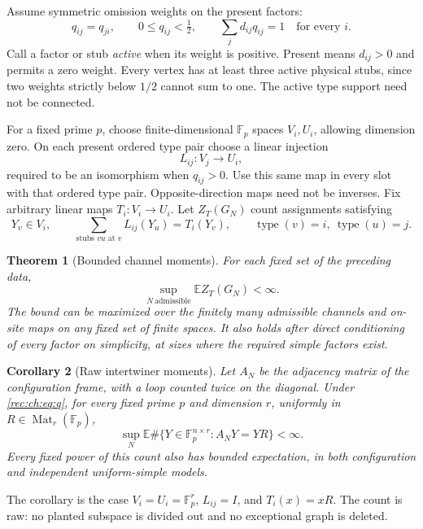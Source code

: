 \documentclass[11pt]{article}
\newtheorem{theorem}{Theorem}[section]
\newtheorem{corollary}[theorem]{Corollary}
\theoremstyle{definition}
\theoremstyle{remark}
\newcommand{\E}{\mathbb E}
\newcommand{\1}{\mathbf 1}
\providecommand{\Fp}{\mathbb F_p}
\begin{document}
Assume symmetric omission weights on the present factors:
\begin{equation}\label{rec:ch:eq:q}
 q_{ij}=q_{ji},\qquad 0\le q_{ij}<\tfrac12,\qquad
 \sum_j d_{ij}q_{ij}=1\quad\text{for every }i.
\end{equation}
Call a factor or stub \emph{active} when its weight is positive. Present means $d_{ij}>0$ and permits a zero weight. Every vertex has at least three active physical stubs, since two weights strictly below $1/2$ cannot sum to one. The active type support need not be connected.

For a fixed prime $p$, choose finite-dimensional $\Fp$ spaces $V_i,U_i$, allowing dimension zero. On each present ordered type pair choose a linear injection
\[
 L_{ij}:V_j\longrightarrow U_i,
\]
required to be an isomorphism when $q_{ij}>0$. Use this same map in every slot with that ordered type pair. Opposite-direction maps need not be inverses. Fix arbitrary linear maps $T_i:V_i\to U_i$. Let $Z_T(G_N)$ count assignments satisfying
\begin{equation}\label{rec:ch:eq:system}
 Y_v\in V_i,\qquad
 \sum_{\text{stubs }vu\text{ at }v}L_{ij}(Y_u)=T_i(Y_v),
 \qquad \operatorname{type}(v)=i,\ \operatorname{type}(u)=j.
\end{equation}

\begin{theorem}[Bounded channel moments]\label{rec:ch:thm:main}
For each fixed set of the preceding data,
\[
 \sup_{N\ \mathrm{admissible}}\E Z_T(G_N)<\infty.
\]
The bound can be maximized over the finitely many admissible channels and on-site maps on any fixed set of finite spaces. It also holds after direct conditioning of every factor on simplicity, at sizes where the required simple factors exist.
\end{theorem}

\begin{corollary}[Raw intertwiner moments]\label{rec:ch:cor:intertwiner}\label{rec:thm:frame-bounded-moment}
Let $A_N$ be the adjacency matrix of the configuration frame, with a loop counted twice on the diagonal. Under \eqref{rec:ch:eq:q}, for every fixed prime $p$ and dimension $r$, uniformly in $R\in\operatorname{Mat}_r(\Fp)$,
\[
 \sup_N\E\#\{Y\in\Fp^{n\times r}:A_NY=YR\}<\infty.
\]
Every fixed power of this count also has bounded expectation, in both configuration and independent uniform-simple models.
\end{corollary}

The corollary is the case $V_i=U_i=\Fp^r$, $L_{ij}=I$, and $T_i(x)=xR$. The count is raw: no planted subspace is divided out and no exceptional graph is deleted.
\end{document}

